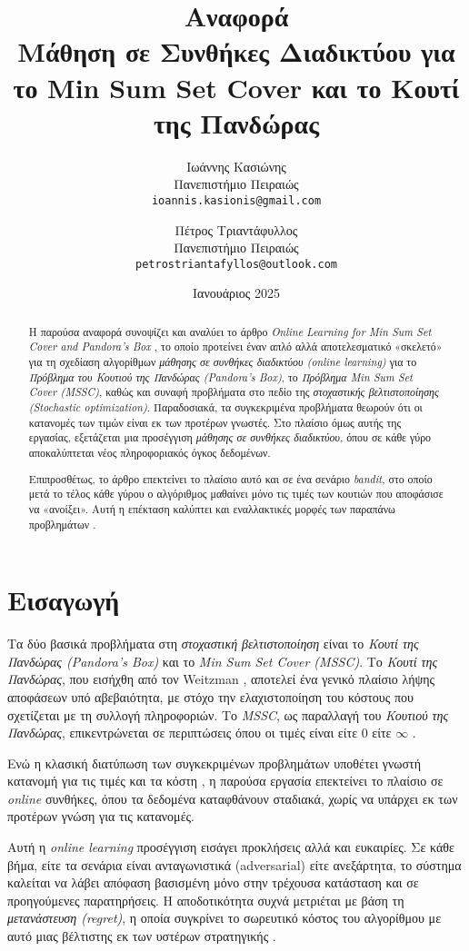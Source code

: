\documentclass[11pt,a4paper]{article}
\title{Αναφορά \\ \textbf{Μάθηση σε Συνθήκες Διαδικτύου για το Min Sum Set Cover και το Κουτί της Πανδώρας}}
\author{
    Ιωάννης Κασιώνης \\ Πανεπιστήμιο Πειραιώς \\ \texttt{ioannis.kasionis@gmail.com}
    \and
    Πέτρος Τριαντάφυλλος \\ Πανεπιστήμιο Πειραιώς \\ \texttt{petrostriantafyllos@outlook.com}
}
\date{Ιανουάριος 2025}
\begin{document}
\maketitle

\begin{abstract}
Η παρούσα αναφορά συνοψίζει και αναλύει το άρθρο \textit{Online Learning for Min Sum Set Cover and Pandora's Box} \cite{gergatsouli2022online}, το οποίο προτείνει έναν απλό αλλά αποτελεσματικό «σκελετό» για τη σχεδίαση αλγορίθμων \textit{μάθησης σε συνθήκες διαδικτύου (online learning)} για το \textit{Πρόβλημα του Κουτιού της Πανδώρας (Pandora's Box)}, το \textit{Πρόβλημα Min Sum Set Cover (MSSC)}, καθώς και συναφή προβλήματα στο πεδίο της \textit{στοχαστικής βελτιστοποίησης (Stochastic optimization)}. Παραδοσιακά, τα συγκεκριμένα προβλήματα θεωρούν ότι οι κατανομές των τιμών είναι εκ των προτέρων γνωστές. Στο πλαίσιο όμως αυτής της εργασίας, εξετάζεται μια προσέγγιση \textit{μάθησης σε συνθήκες διαδικτύου}, όπου σε κάθε γύρο αποκαλύπτεται νέος πληροφοριακός όγκος δεδομένων.\par
Επιπροσθέτως, το άρθρο επεκτείνει το πλαίσιο αυτό και σε ένα σενάριο \textit{bandit}, στο οποίο μετά το τέλος κάθε γύρου ο αλγόριθμος μαθαίνει μόνο τις τιμές των κουτιών που αποφάσισε να «ανοίξει». Αυτή η επέκταση καλύπτει και εναλλακτικές μορφές των παραπάνω προβλημάτων \cite{gergatsouli2022online}.
\end{abstract}
\pagebreak

\section{Εισαγωγή}
Τα δύο βασικά προβλήματα στη \textit{στοχαστική βελτιστοποίηση} είναι το \textit{Κουτί της Πανδώρας (Pandora's Box)} και το \textit{Min Sum Set Cover (MSSC)}. 
Το \textit{Κουτί της Πανδώρας}, που εισήχθη από τον Weitzman \cite{weitzman1978optimal}, αποτελεί ένα γενικό πλαίσιο λήψης αποφάσεων υπό αβεβαιότητα, με στόχο την ελαχιστοποίηση του κόστους που σχετίζεται με τη συλλογή πληροφοριών. 
Το \textit{MSSC}, ως παραλλαγή του \textit{Κουτιού της Πανδώρας}, επικεντρώνεται σε περιπτώσεις όπου οι τιμές είναι είτε $0$ είτε $\infty$ \cite{feige2004approximating}.\par
Ενώ η κλασική διατύπωση των συγκεκριμένων προβλημάτων υποθέτει γνωστή κατανομή για τις τιμές και τα κόστη \cite{gergatsouli2022online}, η παρούσα εργασία επεκτείνει το πλαίσιο σε \textit{online} συνθήκες, όπου τα δεδομένα καταφθάνουν σταδιακά, χωρίς να υπάρχει εκ των προτέρων γνώση για τις κατανομές.\par
Αυτή η \textit{online learning} προσέγγιση εισάγει προκλήσεις αλλά και ευκαιρίες. Σε κάθε βήμα, είτε τα σενάρια είναι ανταγωνιστικά (adversarial) είτε ανεξάρτητα, το σύστημα καλείται να λάβει απόφαση βασισμένη μόνο στην τρέχουσα κατάσταση και σε προηγούμενες παρατηρήσεις. Η αποδοτικότητα συχνά μετριέται με βάση τη \textit{μετανάστευση (regret)}, η οποία συγκρίνει το σωρευτικό κόστος του αλγορίθμου με αυτό μιας βέλτιστης εκ των υστέρων στρατηγικής \cite{shalev2012online}.
\end{document}
